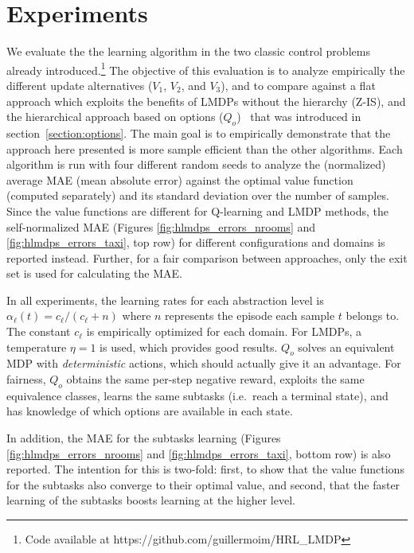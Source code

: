\section{Experiments}
\label{section:hlmdps_experiments}
We evaluate the the learning algorithm in the two classic control problems already introduced.\footnote{Code available at https://github.com/guillermoim/HRL\_LMDP}
The objective of this evaluation is to analyze empirically the different update alternatives ($V_1$, $V_2$, and $V_3$), and
to compare against a flat approach which exploits the benefits of LMDPs without the hierarchy (Z-IS), and the hierarchical approach based on options ($Q_o$)~\citep{Sutton1999} that was introduced in section~\ref{section:options}. The main goal is to empirically demonstrate that the approach here presented is more sample efficient than the other algorithms. Each algorithm is run with four different random seeds to analyze the (normalized) average MAE (mean absolute error) against the optimal value function (computed separately) and its standard deviation over the number of samples. Since the value functions are different for Q-learning and LMDP methods, the self-normalized MAE (Figures \ref{fig:hlmdps_errors_nrooms} and \ref{fig:hlmdps_errors_taxi}, top row) for different configurations and domains is reported instead. Further, for a fair comparison between approaches, only the exit set is used for calculating the MAE.


In all experiments, the learning rates for each abstraction level is $\alpha_\ell(t) = c_\ell / (c_\ell + n)$ where $n$ represents the episode each sample $t$ belongs to. The constant $c_\ell$ is empirically optimized for each domain. For LMDPs, a temperature $\eta=1$ is used, which provides good results. $Q_o$ solves an equivalent MDP with {\em deterministic} actions, which should actually give it an advantage. For fairness, $Q_o$ obtains the same per-step negative reward, exploits the same equivalence classes, learns the same subtasks (i.e.~reach a terminal state), and has knowledge of which options are available in each state.

In addition, the MAE for the subtasks learning (Figures \ref{fig:hlmdps_errors_nrooms} and \ref{fig:hlmdps_errors_taxi}, bottom row) is also reported. The intention for this is two-fold: first, to show that the value functions for the subtasks also converge to their optimal value, and second, that the faster learning of the subtasks boosts learning at the higher level.

